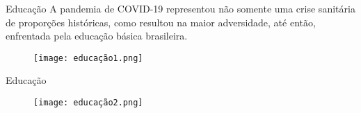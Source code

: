 \begin{frame}[t]{Educação}
    A pandemia de COVID-19 representou não somente uma crise
    sanitária de proporções históricas, como resultou na maior adversidade, até então, enfrentada pela educação básica brasileira.
    \newline
    \begin{table}[ht!]
    \centering
        \begin{center}
            \begin{figure}
                \texttt{[image: educação1.png]}          
            \end{figure}
        \end{center}
    \end{table}
\end{frame}
\begin{frame}[t]{Educação}
    
    \begin{table}[ht!]
    \centering
        \begin{center}
            \begin{figure}
                \texttt{[image: educação2.png]}          
            \end{figure}
        \end{center}
    \end{table}
\end{frame}
